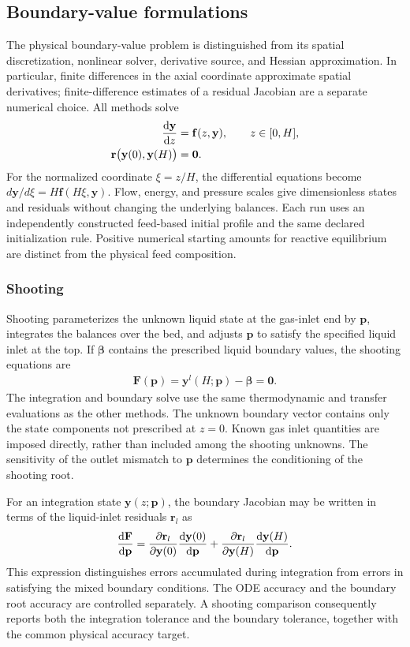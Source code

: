 \subsection{Boundary-value formulations}
The physical boundary-value problem is distinguished from its spatial discretization, nonlinear solver, derivative source, and Hessian approximation.
In particular, finite differences in the axial coordinate approximate spatial derivatives; finite-difference estimates of a residual Jacobian are a separate numerical choice.
All methods solve
\begin{align}
\odv{\mathbf y}{z}&=\mathbf f(z,\mathbf y),\qquad z\in[0,H],\\
\mathbf r\bigl(\mathbf y(0),\mathbf y(H)\bigr)&=\mathbf0.
\label{eq:bvp}
\end{align}
For the normalized coordinate $\xi=z/H$, the differential equations become $d\mathbf y/d\xi=H\mathbf f(H\xi,\mathbf y)$.
Flow, energy, and pressure scales give dimensionless states and residuals without changing the underlying balances.
Each run uses an independently constructed feed-based initial profile and the same declared initialization rule.
Positive numerical starting amounts for reactive equilibrium are distinct from the physical feed composition.

\subsubsection{Shooting}
Shooting parameterizes the unknown liquid state at the gas-inlet end by $\mathbf p$, integrates the balances over the bed, and adjusts $\mathbf p$ to satisfy the specified liquid inlet at the top.
If $\boldsymbol\beta$ contains the prescribed liquid boundary values, the shooting equations are
\begin{align}
\mathbf F(\mathbf p)=\mathbf y^l(H;\mathbf p)-\boldsymbol\beta=\mathbf0.
\end{align}
The integration and boundary solve use the same thermodynamic and transfer evaluations as the other methods.
The unknown boundary vector contains only the state components not prescribed at $z=0$.
Known gas inlet quantities are imposed directly, rather than included among the shooting unknowns.
The sensitivity of the outlet mismatch to $\mathbf p$ determines the conditioning of the shooting root.

For an integration state $\mathbf y(z;\mathbf p)$, the boundary Jacobian may be written in terms of the liquid-inlet residuals $\mathbf r_l$ as
\begin{align}
\odv{\mathbf F}{\mathbf p}
=\pdv{\mathbf r_l}{\mathbf y(0)}\odv{\mathbf y(0)}{\mathbf p}
+\pdv{\mathbf r_l}{\mathbf y(H)}\odv{\mathbf y(H)}{\mathbf p}.
\end{align}
This expression distinguishes errors accumulated during integration from errors in satisfying the mixed boundary conditions.
The ODE accuracy and the boundary root accuracy are controlled separately.
A shooting comparison consequently reports both the integration tolerance and the boundary tolerance, together with the common physical accuracy target.

